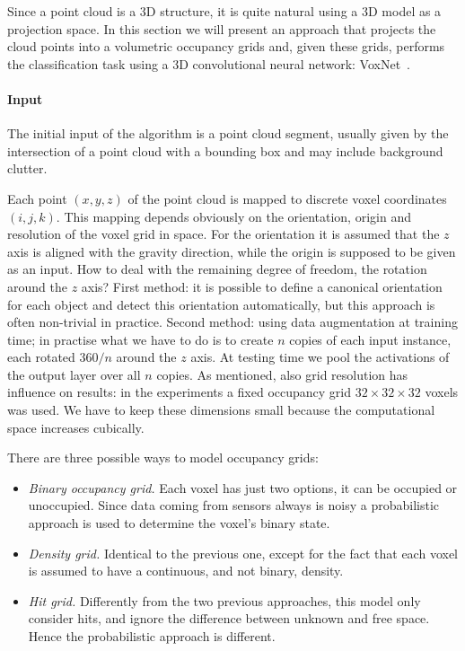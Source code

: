 Since a point cloud is a 3D structure, it is quite natural using a 3D model as a projection space. In this section we will present an approach that projects the cloud points into a volumetric occupancy grids and, given these grids, performs the classification task using a 3D convolutional neural network: VoxNet~\cite{VoxNet}.

\paragraph{Input}
The initial input of the algorithm is a point cloud segment, usually given by the intersection of a point cloud with a bounding box and may include background clutter. 

Each point $(x,y,z)$ of the point cloud is mapped to discrete voxel coordinates $(i,j,k)$. 
This mapping depends obviously on the orientation, origin and resolution of the voxel grid in space. For the orientation it is assumed that the $z$ axis is aligned with the gravity direction, while the origin is supposed to be given as an input. How to deal with the remaining degree of freedom, the rotation around the $z$ axis? First method: it is possible to define a canonical orientation for each object and detect this orientation automatically, but this approach is often non-trivial in practice. Second method: using data augmentation at training time; in practise what we have to do is to create $n$ copies of each input instance, each rotated $360$\textdegree$/n$ around the $z$ axis. At testing time we pool the activations of the output layer over all $n$ copies. As mentioned, also grid resolution has influence on results: in the experiments a fixed occupancy grid $32 \times 32 \times 32$ voxels was used. We have to keep these dimensions small because the computational space increases cubically.

There are three possible ways to model occupancy grids:
\begin{itemize}
\item \emph{Binary occupancy grid. } Each voxel has just two options, it can be occupied or unoccupied. Since data coming from sensors always is noisy a probabilistic approach is used to determine the voxel's binary state.
\item \emph{Density grid. } Identical to the previous one, except for the fact that each voxel is assumed to have a continuous, and not binary, density.
\item \emph{Hit grid. } Differently from the two previous approaches, this model only consider hits, and ignore the difference between unknown and free space. Hence the probabilistic approach is different.
\end{itemize}

